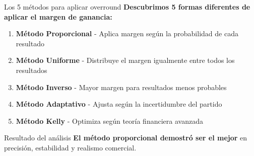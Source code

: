 \documentclass[aspectratio=169]{beamer}
\begin{document}
\begin{frame}{Los 5 métodos para aplicar overround}
\textbf{Descubrimos 5 formas diferentes de aplicar el margen de ganancia:}

\vspace{0.5cm}
\begin{enumerate}
\item \textcolor{azulprincipai}{\textbf{Método Proporcional}} - Aplica margen según la probabilidad de cada resultado
\item \textcolor{verdepositivo}{\textbf{Método Uniforme}} - Distribuye el margen igualmente entre todos los resultados  
\item \textcolor{rojocomplementario}{\textbf{Método Inverso}} - Mayor margen para resultados menos probables
\item \textcolor{azulprincipai}{\textbf{Método Adaptativo}} - Ajusta según la incertidumbre del partido
\item \textcolor{verdepositivo}{\textbf{Método Kelly}} - Optimiza según teoría financiera avanzada
\end{enumerate}

\vspace{0.5cm}
\begin{alertblock}{Resultado del análisis}
\textbf{El método proporcional demostró ser el mejor} en precisión, estabilidad y realismo comercial.
\end{alertblock}
\end{frame}
\end{document}
